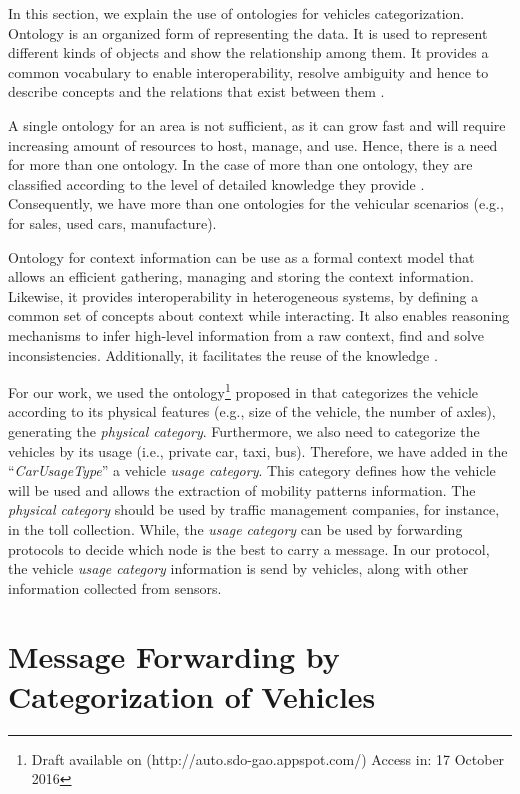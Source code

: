 \documentclass[letterpaper, 10 pt, conference]{ieeeconf}  %
\begin{document}
In this section, we explain the use of ontologies for vehicles categorization. Ontology is an organized form of representing the data. It is used to represent different kinds of objects and show the relationship among them. It provides a common vocabulary to enable interoperability, resolve ambiguity and hence to describe concepts and the relations that exist between them \cite{madkour2011}.

A single ontology for an area is not sufficient, as it can grow fast and will require increasing amount of resources to host, manage, and use. Hence, there is a need for more than one ontology. In the case of more than one ontology, they are classified according to the level of detailed knowledge they provide \cite{packer2010}. Consequently, we have more than one ontologies for the vehicular scenarios (e.g., for sales, used cars, manufacture).

Ontology for context information can be use as a formal context model that allows an efficient gathering, managing and storing the context information. Likewise, it provides interoperability in heterogeneous systems, by defining a common set of concepts about context while interacting. It also enables reasoning mechanisms to infer high-level information from a raw context, find and solve inconsistencies. Additionally, it facilitates the reuse of the knowledge \cite{serrano2007}.

For our work, we used the ontology\footnote{Draft available on (http://auto.sdo-gao.appspot.com/) Access in: 17 October 2016} proposed in \cite{gao_2016} that categorizes the vehicle according to its physical features (e.g., size of the vehicle, the number of axles), generating the \emph{physical category}. Furthermore, we also need to categorize the vehicles by its usage (i.e., private car, taxi, bus). Therefore, we have added in the ``\emph{CarUsageType}'' a vehicle \emph{usage category}.
This category defines how the vehicle will be used and allows the extraction of mobility patterns information. The \emph{physical category} should be used by traffic management companies, for instance, in the toll collection. While, the \emph{usage category} can be used by forwarding protocols to decide which node is the best to carry a message. In our protocol, the vehicle \emph{usage category} information is send by vehicles, along with other information collected from sensors.

\section{Message Forwarding by Categorization of Vehicles}
\end{document}

